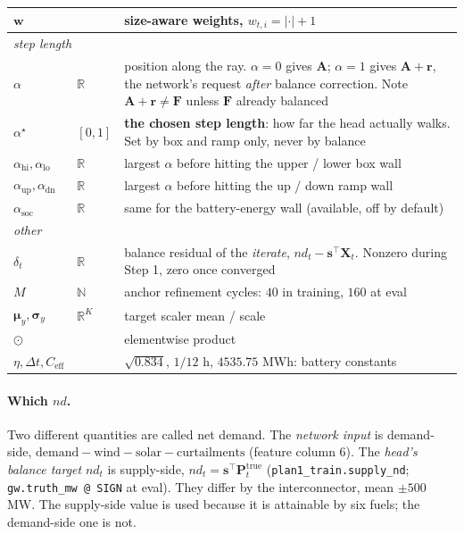 \documentclass[11pt]{article}
\begin{document}
\begin{center}
\begin{tabular}{llp{7.6cm}}
$\mathbf{w}$ & & size-aware weights, $w_{t,i}=|\cdot|+1$ \\
\midrule
\multicolumn{3}{l}{\emph{step length}}\\
$\alpha$ & $\mathbb{R}$ & position along the ray. $\alpha=0$ gives $\mathbf{A}$; $\alpha=1$ gives $\mathbf{A}+\mathbf{r}$, the network's request \emph{after} balance correction. Note $\mathbf{A}+\mathbf{r}\neq\mathbf{F}$ unless $\mathbf{F}$ already balanced \\
$\alpha^{\star}$ & $[0,1]$ & \textbf{the chosen step length}: how far the head actually walks. Set by box and ramp only, never by balance \\
$\alpha_{\mathrm{hi}},\alpha_{\mathrm{lo}}$ & $\mathbb{R}$ & largest $\alpha$ before hitting the upper / lower box wall \\
$\alpha_{\mathrm{up}},\alpha_{\mathrm{dn}}$ & $\mathbb{R}$ & largest $\alpha$ before hitting the up / down ramp wall \\
$\alpha_{\mathrm{soc}}$ & $\mathbb{R}$ & same for the battery-energy wall (available, off by default) \\
\midrule
\multicolumn{3}{l}{\emph{other}}\\
$\delta_t$ & $\mathbb{R}$ & balance residual of the \emph{iterate}, $nd_t-\mathbf{s}^{\!\top}\mathbf{X}_t$. Nonzero during Step 1, zero once converged \\
$M$ & $\mathbb{N}$ & anchor refinement cycles: $40$ in training, $160$ at eval \\
$\bm{\mu}_y,\bm{\sigma}_y$ & $\mathbb{R}^{K}$ & target scaler mean / scale \\
$\odot$ & & elementwise product \\
$\eta,\Delta t,C_{\mathrm{eff}}$ & & $\sqrt{0.834}$, $1/12$ h, $4535.75$ MWh: battery constants \\
\bottomrule
\end{tabular}
\end{center}

\paragraph{Which $nd$.} Two different quantities are called net demand.
The \emph{network input} is demand-side,
$\text{demand}-\text{wind}-\text{solar}-\text{curtailments}$ (feature column 6).
The \emph{head's balance target} $nd_t$ is supply-side,
$nd_t=\mathbf{s}^{\!\top}\mathbf{P}^{\text{true}}_t$
(\texttt{plan1\_train.supply\_nd}; \texttt{gw.truth\_mw @ SIGN} at eval). They
differ by the interconnector, mean $\pm500$ MW. The supply-side value is used
because it is attainable by six fuels; the demand-side one is not.
\end{document}

